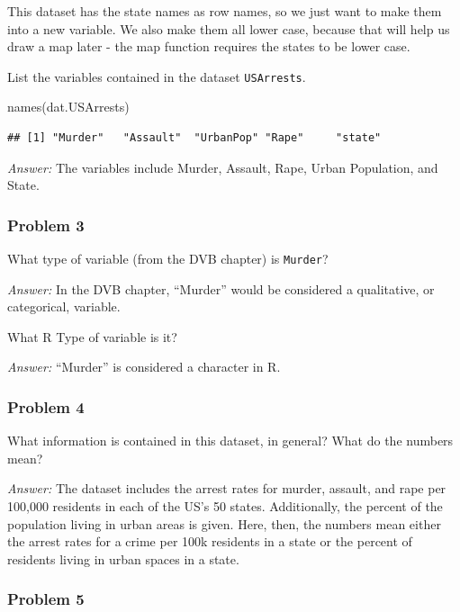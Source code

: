 \documentclass[
]{article}
\newenvironment{Shaded}{\begin{snugshade}}{\end{snugshade}}
\newcommand{\FunctionTok}[1]{\textcolor[rgb]{0.00,0.00,0.00}{#1}}
\newcommand{\NormalTok}[1]{#1}
\begin{document}
This dataset has the state names as row names, so we just want to make
them into a new variable. We also make them all lower case, because that
will help us draw a map later - the map function requires the states to
be lower case.

List the variables contained in the dataset \texttt{USArrests}.

\begin{Shaded}
\begin{Highlighting}[]
\FunctionTok{names}\NormalTok{(dat.USArrests)}
\end{Highlighting}
\end{Shaded}

\begin{verbatim}
## [1] "Murder"   "Assault"  "UrbanPop" "Rape"     "state"
\end{verbatim}

\emph{Answer:} The variables include Murder, Assault, Rape, Urban
Population, and State.

\hypertarget{problem-3}{%
\subsubsection{Problem 3}\label{problem-3}}

What type of variable (from the DVB chapter) is \texttt{Murder}?

\emph{Answer:} In the DVB chapter, ``Murder'' would be considered a
qualitative, or categorical, variable.

What R Type of variable is it?

\emph{Answer:} ``Murder'' is considered a character in R.

\hypertarget{problem-4}{%
\subsubsection{Problem 4}\label{problem-4}}

What information is contained in this dataset, in general? What do the
numbers mean?

\emph{Answer:} The dataset includes the arrest rates for murder,
assault, and rape per 100,000 residents in each of the US's 50 states.
Additionally, the percent of the population living in urban areas is
given. Here, then, the numbers mean either the arrest rates for a crime
per 100k residents in a state or the percent of residents living in
urban spaces in a state.

\hypertarget{problem-5}{%
\subsubsection{Problem 5}\label{problem-5}}
\end{document}
